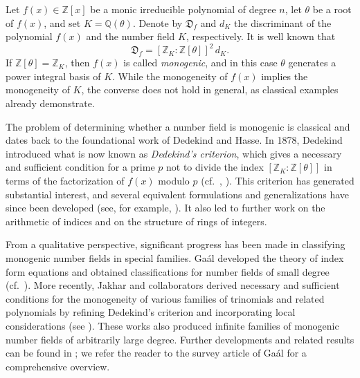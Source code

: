 \documentclass[table]{amsart}
\newcommand{\D}{\mathfrak{D}}
\numberwithin{equation}{section}
\begin{document}
Let $f(x)\in\mathbb{Z}[x]$ be a monic irreducible polynomial of degree $n$, let $\theta$ be a root of $f(x)$, and set $K=\mathbb{Q}(\theta)$.
Denote by $\D_f$ and $d_K$ the discriminant of the polynomial $f(x)$ and the number field $K$, respectively.
It is well known that
\begin{equation}\label{eq:disc-relation}
\D_f=[\mathbb{Z}_K:\mathbb{Z}[\theta]]^2\, d_K.
\end{equation}
If $\mathbb{Z}[\theta]=\mathbb{Z}_K$, then $f(x)$ is called \emph{monogenic}, and in this case $\theta$ generates a power integral basis of $K$.
While the monogeneity of $f(x)$ implies the monogeneity of $K$, the converse does not hold in general, as classical examples already demonstrate.

The problem of determining whether a number field is monogenic is classical and dates back to the foundational work of Dedekind and Hasse.
In 1878, Dedekind introduced what is now known as \emph{Dedekind’s  criterion}, which gives a necessary and sufficient condition for a prime $p$ not to divide the index $[\mathbb{Z}_K:\mathbb{Z}[\theta]]$ in terms of the factorization of $f(x)$ modulo $p$ (cf.\ \cite[Theorem~6.1.4]{HC}, \cite{RD1878}).
This criterion has generated substantial interest, and several equivalent formulations and generalizations have since been developed (see, for example, \cite{MEC, JNT, Jh-Kh}). It also led to further work on the arithmetic of indices and on the structure of rings of integers.

From a qualitative perspective, significant progress has been made in classifying monogenic number fields in special families.
Ga\'al developed the theory of index form equations and obtained classifications for number fields of small degree (cf.\ \cite{Gaal}).
More recently, Jakhar and collaborators derived necessary and sufficient conditions for the monogeneity of various families of trinomials and related polynomials by refining Dedekind’s criterion and incorporating local considerations (see \cite{JNT, jKN, J-K-K, J-K-Y}).
These works also produced infinite families of monogenic number fields of arbitrarily large degree.
Further developments and related results can be found in \cite{Jones, JonesHarr, BNW2025,BNW2026, S-L-S, Smith2021, GR2017, KKR}; we refer the reader to the survey article of Ga\'al \cite{Gaal} for a comprehensive overview.
\end{document}
